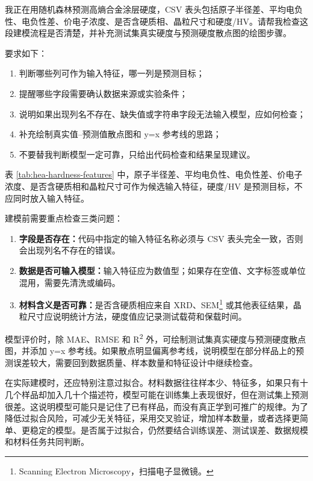 \begin{samepage}
\begin{userbox}
我正在用随机森林预测高熵合金涂层硬度，CSV 表头包括原子半径差、平均电负性、电负性差、价电子浓度、是否含硬质相、晶粒尺寸和硬度/HV。请帮我检查这段建模流程是否清楚，并补充测试集真实硬度与预测硬度散点图的绘图步骤。

要求如下：
\begin{enumerate}
\item 判断哪些列可作为输入特征，哪一列是预测目标；
\item 提醒哪些字段需要确认数据来源或实验条件；
\item 说明如果出现列名不存在、缺失值或字符串字段无法输入模型，应如何检查；
\item 补充绘制真实值--预测值散点图和 y=x 参考线的思路；
\item 不要替我判断模型一定可靠，只给出代码检查和结果呈现建议。
\end{enumerate}
\end{userbox}

\begin{aibox}
表 \ref{tab:hea-hardness-features} 中，原子半径差、平均电负性、电负性差、价电子浓度、是否含硬质相和晶粒尺寸可作为候选输入特征，硬度/HV 是预测目标，不应同时放入输入特征。

建模前需要重点检查三类问题：
\begin{enumerate}
\item \textbf{字段是否存在：}代码中指定的输入特征名称必须与 CSV 表头完全一致，否则会出现列名不存在的错误。
\item \textbf{数据是否可输入模型：}输入特征应为数值型；如果存在空值、文字标签或单位混用，需要先清洗或编码。
\item \textbf{材料含义是否可靠：}是否含硬质相应来自 XRD、SEM\footnote{Scanning Electron Microscopy，扫描电子显微镜。} 或其他表征结果，晶粒尺寸应说明统计方法，硬度值应记录测试载荷和保载时间。
\end{enumerate}

模型评价时，除 MAE、RMSE 和 R\textsuperscript{2} 外，可绘制测试集真实硬度与预测硬度散点图，并添加 y=x 参考线。如果散点明显偏离参考线，说明模型在部分样品上的预测误差较大，需要回到数据质量、样本数量和特征设计中继续检查。
\end{aibox}
\end{samepage}

在实际建模时，还应特别注意过拟合。材料数据往往样本少、特征多，如果只有十几个样品却加入几十个描述符，模型可能在训练集上表现很好，但在测试集上预测很差。这说明模型可能只是记住了已有样品，而没有真正学到可推广的规律。为了降低过拟合风险，可减少无关特征，采用交叉验证，增加样本数量，或者选择更简单、更稳定的模型。是否属于过拟合，仍然要结合训练误差、测试误差、数据规模和材料任务共同判断。


